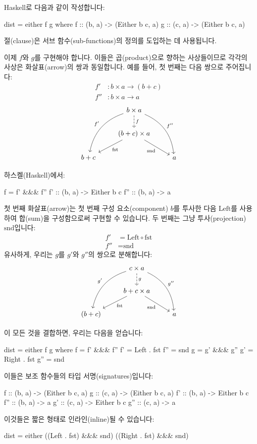 \documentclass[DaoFP]{subfiles}
\begin{document}
Haskell로 다음과 같이 작성합니다:
\begin{haskell}
dist = either f g
  where
    f   :: (b, a) -> (Either b c, a)
    g   :: (c, a) -> (Either b c, a)
\end{haskell}
 절(clause)은 서브 함수(sub-functions)의 정의를 도입하는 데 사용됩니다.

이제 $f$와 $g$를 구현해야 합니다. 이들은 곱(product)으로 향하는 사상들이므로 각각의 사상은 화살표(arrow)의 쌍과 동일합니다. 예를 들어, 첫 번째는 다음 쌍으로 주어집니다:
\begin{align*}
f' &\colon b \times a \to (b + c) \\
f'' &\colon b \times a \to  a
\end{align*}
\[
 \begin{tikzcd}
 & b \times a
\arrow[d, dashed, "f"]
 \arrow[ddl, bend right, "f'"']
 \arrow[ddr, bend left, "f''"]
\\
& (b + c) \times a
 \arrow[dl,  "\text{fst}"]
  \arrow[dr,   "\text{snd}"']
\\
b + c && a
 \end{tikzcd}
\]

하스켈(Haskell)에서:
\begin{haskell}
    f = f' &&& f''
    f'  :: (b, a) -> Either b c
    f'' :: (b, a) -> a
\end{haskell}
첫 번째 화살표(arrow)는 첫 번째 구성 요소(component) $b$를 투사한 다음 $\text{Left}$를 사용하여 합(sum)을 구성함으로써 구현할 수 있습니다. 두 번째는 그냥 투사(projection) $\text{snd}$입니다:
\begin{align*}
 f' &= \text{Left} \circ \text{fst} \\
 f'' &= \text{snd}
\end{align*}
유사하게, 우리는 $g$를 $g'$와 $g''$의 쌍으로 분해합니다:
\[
 \begin{tikzcd}
 & c \times a
\arrow[d, dashed, "g"]
 \arrow[ddl, bend right, "g'"']
 \arrow[ddr, bend left, "g''"]
\\
& b + c \times a
 \arrow[dl,  "\text{fst}"]
  \arrow[dr,   "\text{snd}"']
\\
(b + c) && a
 \end{tikzcd}
\]

이 모든 것을 결합하면, 우리는 다음을 얻습니다:
\begin{haskell}
dist = either f g
  where
    f   = f' &&& f''
    f'  = Left . fst
    f'' = snd
    g   = g' &&& g''
    g'  = Right . fst
    g'' = snd
\end{haskell}
이들은 보조 함수들의 타입 서명(signatures)입니다:
\begin{haskell}
    f   :: (b, a) -> (Either b c, a)
    g   :: (c, a) -> (Either b c, a)
    f'  :: (b, a) -> Either b c
    f'' :: (b, a) -> a
    g'  :: (c, a) -> Either b c
    g'' :: (c, a) -> a
\end{haskell}
이것들은 짧은 형태로 인라인(inline)될 수 있습니다:
\begin{haskell}
dist = either ((Left . fst) &&& snd) ((Right . fst) &&& snd)
\end{haskell}
\end{document}
